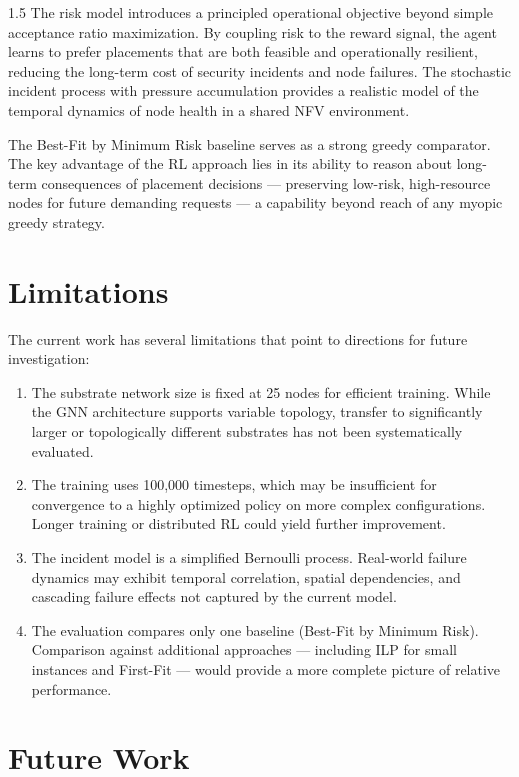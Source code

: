 \documentclass[A4paper,12pt]{report}
\theoremstyle{plain}
\theoremstyle{definition}
\theoremstyle{remark}
\numberwithin{equation}{section}
\begin{document}
\begin{spacing}{1.5}
The risk model introduces a principled operational objective beyond simple acceptance ratio maximization. By coupling risk to the reward signal, the agent learns to prefer placements that are both feasible and operationally resilient, reducing the long-term cost of security incidents and node failures. The stochastic incident process with pressure accumulation provides a realistic model of the temporal dynamics of node health in a shared NFV environment.

The Best-Fit by Minimum Risk baseline serves as a strong greedy comparator. The key advantage of the RL approach lies in its ability to reason about long-term consequences of placement decisions — preserving low-risk, high-resource nodes for future demanding requests — a capability beyond reach of any myopic greedy strategy.

\section{Limitations}

The current work has several limitations that point to directions for future investigation:

\begin{enumerate}
  \item The substrate network size is fixed at 25 nodes for efficient training. While the GNN architecture supports variable topology, transfer to significantly larger or topologically different substrates has not been systematically evaluated.
  \item The training uses 100,000 timesteps, which may be insufficient for convergence to a highly optimized policy on more complex configurations. Longer training or distributed RL could yield further improvement.
  \item The incident model is a simplified Bernoulli process. Real-world failure dynamics may exhibit temporal correlation, spatial dependencies, and cascading failure effects not captured by the current model.
  \item The evaluation compares only one baseline (Best-Fit by Minimum Risk). Comparison against additional approaches — including ILP for small instances and First-Fit — would provide a more complete picture of relative performance.
\end{enumerate}

\section{Future Work}


\end{spacing}
\end{document}
